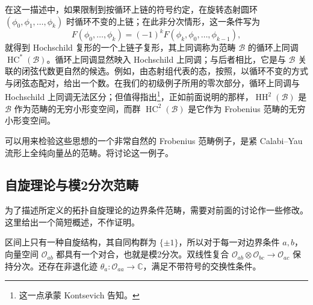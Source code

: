 在这一描述中，如果限制到按循环上链的符号约定，在旋转态射圆环 $(\phi_0,\phi_1,\ldots,\phi_k)$ 时循环不变的上链；在此非分次情形，这一条件写为
\[
F(\phi_0,\ldots,\phi_k)=(-1)^kF(\phi_k,\phi_0,\ldots,\phi_{k-1}),
\]
就得到 Hochschild 复形的一个上链子复形，其上同调称为范畴 $\mathcal{B}$ 的循环上同调 $\operatorname{HC}^*(\mathcal{B})$。循环上同调显然映入 Hochschild 上同调；与后者相比，它是与 $\mathcal{B}$ 关联的闭弦代数更自然的候选。例如，由态射组代表的态，按照，以循环不变的方式与闭弦态配对，给出一个数。在我们的初级例子所用的零次部分，循环上同调与 Hochschild 上同调无法区分；但值得指出\footnote{这一点承蒙 Kontsevich 告知。}，正如前面说明的那样，$\operatorname{HH}^2(\mathcal{B})$ 是 $\mathcal{B}$ 作为范畴的无穷小形变空间，而群 $\operatorname{HC}^2(\mathcal{B})$ 是它作为 Frobenius 范畴的无穷小形变空间。

可以用来检验这些思想的一个非常自然的 Frobenius 范畴例子，是紧 Calabi--Yau 流形上全纯向量丛的范畴。将讨论这一例子。

\subsection{自旋理论与模2分次范畴}\label{sec:2.2.4}

为了描述所定义的拓扑自旋理论的边界条件范畴，需要对前面的讨论作一些修改。这里给出一个简短概述，不作证明。

区间上只有一种自旋结构，其自同构群为 $\{\pm1\}$，所以对于每一对边界条件 $a,b$，向量空间 $\mathcal{O}_{ab}$ 都具有一个对合，也就是模2分次。双线性复合 $\mathcal{O}_{ab}\otimes\mathcal{O}_{bc}\to\mathcal{O}_{ac}$ 保持分次。还存在非退化迹 $\theta_a\colon\mathcal{O}_{aa}\to\mathbb{C}$，满足不带符号的交换性条件。

